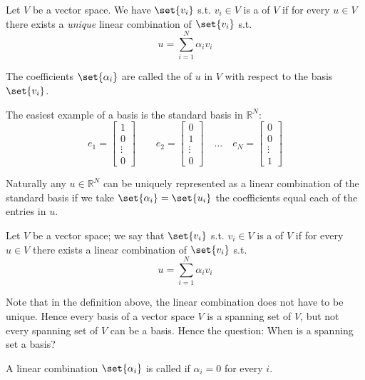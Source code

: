 \documentclass{article}
\begin{document}
\begin{definition}
  Let $V$ be a vector space. We have $\set{v_i}$ s.t. $v_i \in V$ is a  of $V$ if for every $u \in V$ there exists a \textit{unique} linear combination of $\set{v_i}$ s.t.
  \[
    u = \sum^{N}_{i = 1} \alpha_i v_i
  \]

  The coefficients $\set{\alpha_i}$ are called the  of $u$ in $V$ with respect to the basis $\set{v_i}$.
\end{definition}

The easiest example of a basis is the standard basis in $\mathbb{R}^N$:
\[
  e_1 = \left[\begin{matrix}
    1 \\ 0 \\ \vdots \\ 0
  \end{matrix}\right]
  \quad\quad
  e_2 = \left[\begin{matrix}
    0 \\ 1 \\ \vdots \\ 0
  \end{matrix}\right]
  \quad\ldots\quad
  e_N = \left[\begin{matrix}
    0 \\ 0 \\ \vdots \\ 1
  \end{matrix}\right]
\]

Naturally any $u \in \mathbb{R}^N$ can be uniquely represented as a linear combination of the standard basis if we take $\set{\alpha_i} = \set{u_i}$ the coefficients equal each of the entries in $u$.

\begin{definition}
  Let $V$ be a vector space; we say that $\set{v_i}$ s.t. $v_i \in V$ is a  of $V$ if for every $u \in V$ there exists a linear combination of $\set{v_i}$ s.t.
  \[
    u = \sum^{N}_{i = 1} \alpha_i v_i
  \]
\end{definition}

Note that in the definition above, the linear combination does not have to be unique. Hence every basis of a vector space $V$ is a spanning set of $V$, but not every spanning set of $V$ can be a basis. Hence the question: When is a spanning set a basis?

\begin{definition}
  A linear combination $\set{\alpha_i}$ is called  if $\alpha_i = 0$ for every $i$.
\end{definition}
\end{document}
